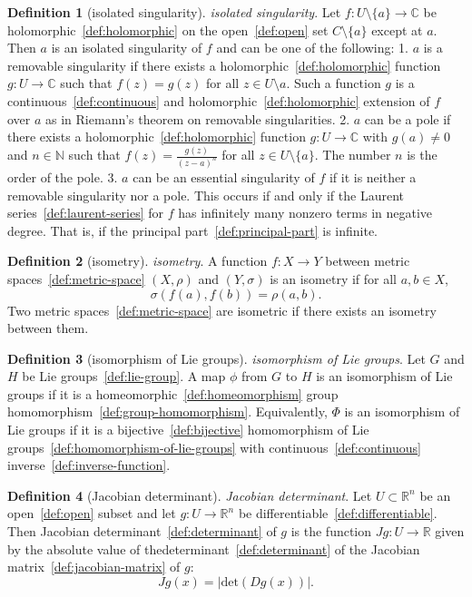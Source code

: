 \documentclass[12pt,a4paper]{article}
\theoremstyle{definition}
\newtheorem{definition}{Definition}
\begin{document}
\begin{definition}[isolated singularity]\label{def:isolated-singularity}
\emph{isolated singularity}. Let $f:U\setminus\{a\}\to \mathbb C$ be holomorphic~\ref{def:holomorphic} on the open~\ref{def:open} set $C\setminus \{a\}$ except at $a$. Then $a$ is an isolated singularity of $f$ and can be one of the following:
1. $a$ is a removable singularity if there exists a holomorphic~\ref{def:holomorphic} function $g:U\to \mathbb C$ such that $f(z) = g(z)$ for all $z\in U\setminus a$. Such a function $g$ is a continuous~\ref{def:continuous} and holomorphic~\ref{def:holomorphic} extension of $f$ over $a$ as in Riemann's theorem on removable singularities.
2. $a$ can be a pole if there exists a holomorphic~\ref{def:holomorphic} function $g:U\to\mathbb C$ with $g(a)\neq 0$ and $n\in\mathbb N$ such that $f(z) = \frac{g(z)}{(z-a)^n}$ for all $z\in U\setminus \{a\}$. The number $n$ is the order of the pole.
3. $a$ can be an essential singularity of $f$ if it is neither a removable singularity nor a pole. This occurs if and only if the Laurent series~\ref{def:laurent-series} for $f$ has infinitely many nonzero terms in negative degree. That is, if the principal part~\ref{def:principal-part} is infinite.
\end{definition}

\begin{definition}[isometry]\label{def:isometry}
\emph{isometry}. A function $f: X\to Y$ between metric spaces~\ref{def:metric-space} $(X, \rho)$ and $(Y,\sigma)$ is an isometry if for all $a,b \in X$, $$\sigma(f(a), f(b)) = \rho(a,b).$$ Two metric spaces~\ref{def:metric-space} are isometric if there exists an isometry between them.
\end{definition}

\begin{definition}[isomorphism of Lie groups]\label{def:isomorphism-of-lie-groups}
\emph{isomorphism of Lie groups}. Let $G$ and $H$ be Lie groups~\ref{def:lie-group}. A map $\phi$ from $G$ to $H$ is an isomorphism of Lie groups if it is a homeomorphic~\ref{def:homeomorphism} group homomorphism~\ref{def:group-homomorphism}. Equivalently, $\Phi$ is an isomorphism of Lie groups if it is a bijective~\ref{def:bijective} homomorphism of Lie groups~\ref{def:homomorphism-of-lie-groups} with continuous~\ref{def:continuous} inverse~\ref{def:inverse-function}.
\end{definition}

\begin{definition}[Jacobian determinant]\label{def:jacobian-determinant}
\emph{Jacobian determinant}. Let $U\subset\mathbb R^n$ be an open~\ref{def:open} subset and let $g: U \to\mathbb R^n$ be  differentiable~\ref{def:differentiable}. Then Jacobian determinant~\ref{def:determinant} of $g$ is the function $Jg:U\to\mathbb R$ given by the absolute value of thedeterminant~\ref{def:determinant} of the Jacobian matrix~\ref{def:jacobian-matrix} of $g$: $$Jg(x)= \vert \text{det}(Dg(x))\vert .$$
\end{definition}
\end{document}
